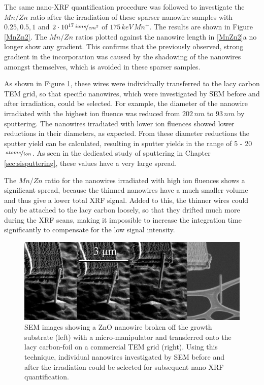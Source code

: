 The same nano-XRF quantification procedure was followed to investigate the $Mn/Zn$ ratio after the irradiation of these sparser nanowire samples with $0.25, 0.5, 1$ and $2\cdot 10^{17}\,\nicefrac{ions}{cm^2}$ of $175\,keV\,Mn^+$. The results are shown in Figure \ref{MnZn2}. The $Mn/Zn$ ratios plotted against the nanowire length in \ref{MnZn2}a no longer show any gradient. This confirms that the previously observed, strong gradient in the incorporation was caused by the shadowing of the nanowires amongst themselves, which is avoided in these sparser samples.

As shown in Figure \ref{SEMbreak}, these wires were individually transferred to the lacy carbon TEM grid, so that specific nanowires, which were investigated by SEM before and after irradiation, could be selected. For example, the diameter of the nanowire irradiated with the highest ion fluence was reduced from $202\,nm$ to $93\,nm$ by sputtering. The nanowires irradiated with lower ion fluences showed lower reductions in their diameters, as expected. From these diameter reductions the sputter yield can be calculated, resulting in sputter yields in the range of 5 - 20$\,\nicefrac{atoms}{ion}$. As seen in the dedicated study of sputtering in Chapter \ref{sec:sisputtering}, these values have a very large spread. 

The $Mn/Zn$ ratio for the nanowires irradiated with high ion fluences shows a significant spread, because the thinned nanowires have a much smaller volume and thus give a lower total XRF signal. Added to this, the thinner wires could only be attached to the lacy carbon loosely, so that they drifted much more during the XRF scans, making it impossible to increase the integration time significantly to compensate for the low signal intensity. 

\begin{figure}[h]
	\centering
		\includegraphics[width=.8\textwidth]{images/SEMbreak2.jpg}
	\caption{SEM images showing a ZnO nanowire broken off the growth substrate (left) with a micro-manipulator and transferred onto the lacy carbon-foil on a commercial TEM grid (right). Using this technique, individual nanowires investigated by SEM before and after the irradiation could be selected for subsequent nano-XRF quantification.}
	\label{SEMbreak}
\end{figure}


